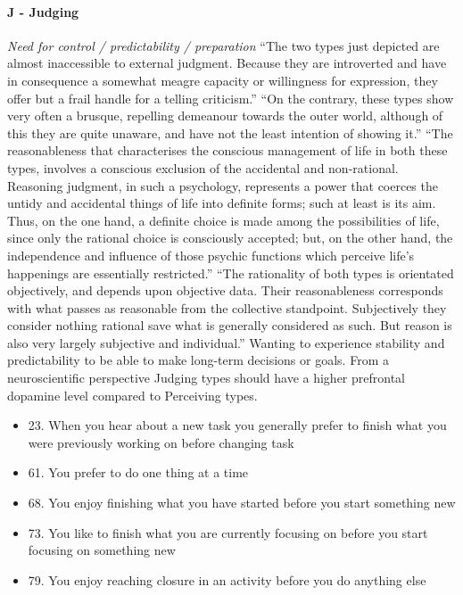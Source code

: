 \documentclass[11pt,a4paper]{article}
\begin{document}
\paragraph{J - Judging}
\emph{Need for control / predictability / preparation}
``The two types just depicted are almost inaccessible to external judgment. Because they are introverted and have in consequence a somewhat meagre capacity or willingness for expression, they offer but a frail handle for a telling criticism.''\cite[p. 511]{jung1}
``On the contrary, these types show very often a brusque, repelling demeanour towards the outer world, although of this they are quite unaware, and have not the least intention of showing it.''\cite[p. 511]{jung1}
``The reasonableness that characterises the conscious management of life in both these types, involves a conscious exclusion of the accidental and non-rational. Reasoning judgment, in such a psychology, represents a power that coerces the untidy and accidental things of life into definite forms; such at least is its aim. Thus, on the one hand, a definite choice is made among the possibilities of life, since only the rational choice is consciously accepted; but, on the other hand, the independence and influence of those psychic functions which perceive life's happenings are essentially restricted.''\cite[p. 454]{jung1}
``The rationality of both types is orientated objectively, and depends upon objective data. Their reasonableness corresponds with what passes as reasonable from the collective standpoint. Subjectively they consider nothing rational save what is generally considered as such. But reason is also very largely subjective and individual.''\cite[p. 455]{jung1}
Wanting to experience stability and predictability to be able to make long-term decisions or goals.
From a neuroscientific perspective Judging types should have a higher prefrontal dopamine level compared to Perceiving types.
\begin{itemize}
\item 23. When you hear about a new task you generally prefer to finish what you were previously working on before changing task
\item 61. You prefer to do one thing at a time
\item 68. You enjoy finishing what you have started before you start something new
\item 73. You like to finish what you are currently focusing on before you start focusing on something new
\item 79. You enjoy reaching closure in an activity before you do anything else
\end{itemize}
\end{document}
